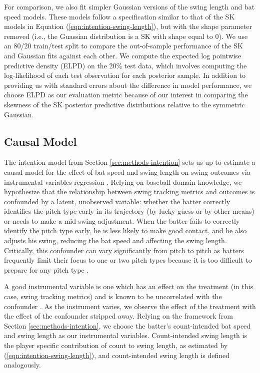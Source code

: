 \documentclass{article}
\begin{document}
    For comparison, we also fit simpler Gaussian versions of the swing length and bat speed models. These models follow a specification similar to that of the SK models in Equation (\ref{eqn:intention-swing-length}), but with the shape parameter removed (i.e., the Guassian distribution is a SK with shape equal to 0). We use an 80/20 train/test split to compare the out-of-sample performance of the SK and Gaussian fits against each other. We compute the expected log pointwise predictive density (ELPD) on the 20\% test data, which involves computing the log-likelihood of each test observation for each posterior sample. In addition to providing us with standard errors about the difference in model performance, we choose ELPD as our evaluation metric because of our interest in comparing the skewness of the SK posterior predictive distributions relative to the symmetric Gaussian.

    \subsection{Causal Model}
    \label{sec:methods-causal}

      The intention model from Section \ref{sec:methods-intention} sets us up to estimate a causal model for the effect of bat speed and swing length on swing outcomes via instrumental variables regression \citep{bollen_instrumental_2012}. Relying on baseball domain knowledge, we hypothesize that the relationship between swing tracking metrics and outcomes is confounded by a latent, unobserved variable: whether the batter correctly identifies the pitch type early in its trajectory (by lucky guess or by other means) or needs to make a mid-swing adjustment. When the batter fails to correctly identify the pitch type early, he is less likely to make good contact, and he also adjusts his swing, reducing the bat speed and affecting the swing length. Critically, this confounder can vary significantly from pitch to pitch as batters frequently limit their focus to one or two pitch types because it is too difficult to prepare for any pitch type \citep{gray_markov_2002}.

      A good instrumental variable is one which has an effect on the treatment (in this case, swing tracking metrics) and is known to be uncorrelated with the confounder \citep{bollen_instrumental_2012}. As the instrument varies, we observe the effect of the treatment with the effect of the confounder stripped away. Relying on the framework from Section \ref{sec:methods-intention}, we choose the batter's count-intended bat speed and swing length as our instrumental variables. Count-intended swing length is the player specific contribution of count to swing length, as estimated by (\ref{eqn:intention-swing-length}), and count-intended swing length is defined analogously.
\end{document}
